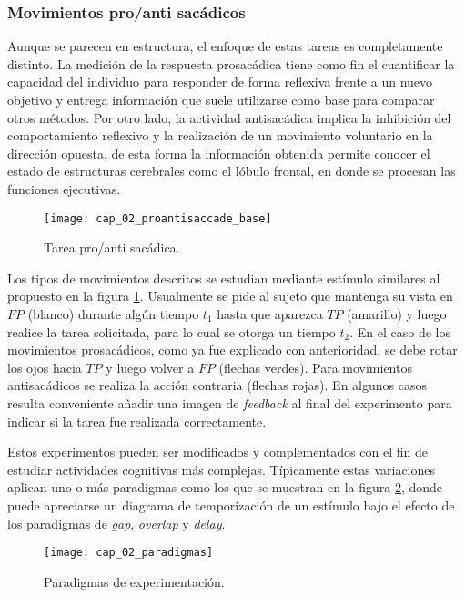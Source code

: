 \documentclass[../main.tex]{subfiles}
\begin{document}
			\vspace{-5mm}
			\subsubsection{Movimientos pro/anti sacádicos}
			\label{ssub:movimientos_pro_anti_sacadicos}
				Aunque se parecen en estructura, el enfoque de estas tareas es completamente distinto. La medición de la respuesta prosacádica tiene como fin el cuantificar la capacidad del individuo para responder de forma reflexiva frente a un nuevo objetivo y entrega información que suele utilizarse como base para comparar otros métodos. Por otro lado, la actividad antisacádica implica la inhibición del comportamiento reflexivo y la realización de un movimiento voluntario en la dirección opuesta, de esta forma la información obtenida permite conocer el estado de estructuras cerebrales como el lóbulo frontal, en donde se procesan las funciones ejecutivas.	
				\begin{figure}[H]
					\centering
					\texttt{[image: cap\_02\_proantisaccade\_base]}
					\caption{Tarea pro/anti sacádica.}
					\label{fig:02_pro_anti_saccade_base}
				\end{figure}  

				Los tipos de movimientos descritos se estudian mediante estímulo similares al propuesto en la figura \ref{fig:02_pro_anti_saccade_base}. Usualmente se pide al sujeto que mantenga su vista en $FP$ (blanco) durante algún tiempo $t_1$ hasta que aparezca $TP$ (amarillo) y luego realice la tarea solicitada, para lo cual se otorga un tiempo $t_2$. En el caso de los movimientos prosacádicos, como ya fue explicado con anterioridad, se debe rotar los ojos hacia $TP$ y luego volver a $FP$ (flechas verdes). Para movimientos antisacádicos se realiza la acción contraria (flechas rojas). En algunos casos resulta conveniente añadir una imagen de \textit{feedback} al final del experimento para indicar si la tarea fue realizada correctamente. 

				Estos experimentos pueden ser modificados y complementados con el fin de estudiar actividades cognitivas más complejas. Típicamente estas variaciones aplican uno o más paradigmas como los que se muestran en la figura \ref{fig:02_paradigmas}, donde puede apreciarse un diagrama de temporización de un estímulo bajo el efecto de los paradigmas de \textit{gap}, \textit{overlap} y \textit{delay}. 
				\begin{figure}[H]
					\centering
					\texttt{[image: cap\_02\_paradigmas]}
					\caption{Paradigmas de experimentación.}
					\label{fig:02_paradigmas}
				\end{figure} 
\end{document}
